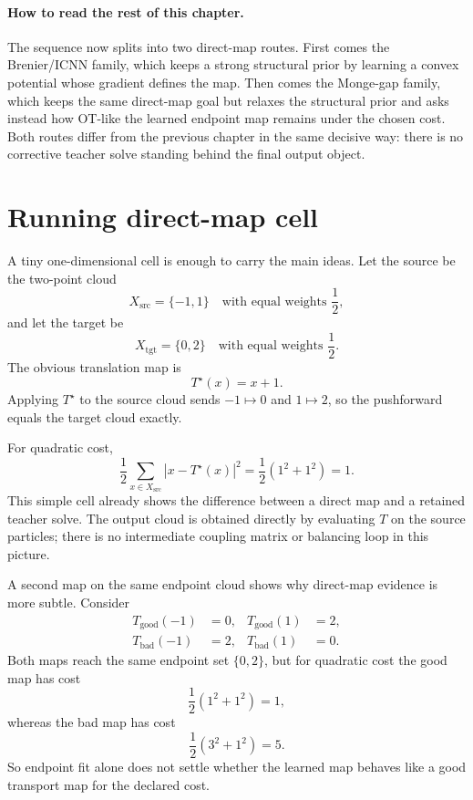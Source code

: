 \paragraph{How to read the rest of this chapter.}
The sequence now splits into two direct-map routes.  First comes the
Brenier/ICNN family, which keeps a strong structural prior by learning a convex
potential whose gradient defines the map.  Then comes the Monge-gap family,
which keeps the same direct-map goal but relaxes the structural prior and asks
instead how OT-like the learned endpoint map remains under the chosen cost.
Both routes differ from the previous chapter in the same decisive way: there is
no corrective teacher solve standing behind the final output object.

\section{Running direct-map cell}
\label{sec:bf-neural-ot-direct-running-cell}

A tiny one-dimensional cell is enough to carry the main ideas.  Let the source
be the two-point cloud
\[
  X_{\mathrm{src}}=\{-1,1\}
  \quad\text{with equal weights }\frac{1}{2},
\]
and let the target be
\[
  X_{\mathrm{tgt}}=\{0,2\}
  \quad\text{with equal weights }\frac{1}{2}.
\]
The obvious translation map is
\begin{equation}
\label{eq:bf-neural-ot-direct-shift-map}
  T^\star(x)=x+1.
\end{equation}
Applying \(T^\star\) to the source cloud sends \(-1\mapsto 0\) and
\(1\mapsto 2\), so the pushforward equals the target cloud exactly.

For quadratic cost,
\begin{equation}
\label{eq:bf-neural-ot-direct-shift-cost}
  \frac{1}{2}\sum_{x\in X_{\mathrm{src}}}|x-T^\star(x)|^2
  =
  \frac{1}{2}(1^2+1^2)=1.
\end{equation}
This simple cell already shows the difference between a direct map and a retained
teacher solve.  The output cloud is obtained directly by evaluating \(T\) on the
source particles; there is no intermediate coupling matrix or balancing loop in
this picture.

A second map on the same endpoint cloud shows why direct-map evidence is more
subtle.  Consider
\begin{align}
\label{eq:bf-neural-ot-direct-good-bad-maps}
  T_{\mathrm{good}}(-1)&=0,
  &T_{\mathrm{good}}(1)&=2,\\
  T_{\mathrm{bad}}(-1)&=2,
  &T_{\mathrm{bad}}(1)&=0.
\end{align}
Both maps reach the same endpoint set \(\{0,2\}\), but for quadratic cost the
good map has cost
\[
  \frac{1}{2}(1^2+1^2)=1,
\]
whereas the bad map has cost
\[
  \frac{1}{2}(3^2+1^2)=5.
\]
So endpoint fit alone does not settle whether the learned map behaves like a
good transport map for the declared cost.

